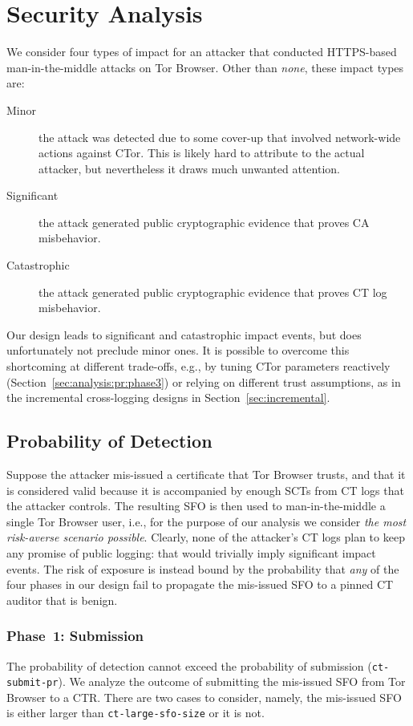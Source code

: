 \section{Security Analysis} \label{sec:analysis}
We consider four types of impact for an attacker that conducted
HTTPS-based man-in-the-middle attacks on Tor Browser.  Other than \emph{none},
these impact types are:
\begin{description}
	\item[Minor] the attack was detected due to some cover-up that involved
		network-wide actions against CTor.  This is likely hard to attribute to
		the actual attacker, but nevertheless it draws much unwanted attention.
	\item[Significant] the attack generated public cryptographic evidence
		that proves CA misbehavior.
	\item[Catastrophic] the attack generated public cryptographic evidence
		that proves CT log misbehavior.
\end{description}

Our design leads to significant and catastrophic impact events, but does
unfortunately not preclude minor ones.  It is possible to overcome this
shortcoming at different trade-offs, e.g., by tuning CTor parameters reactively
(Section~\ref{sec:analysis:pr:phase3}) or relying on different trust
assumptions, as in the incremental cross-logging designs in
Section~\ref{sec:incremental}.

\subsection{Probability of Detection} \label{sec:analysis:pr}
Suppose the attacker mis-issued a certificate that Tor Browser trusts, and that
it is considered valid because it is accompanied by enough SCTs from CT logs
that the attacker controls.  The resulting SFO is then used to man-in-the-middle
a single Tor Browser user, i.e., for the purpose of our analysis we consider
\emph{the most risk-averse scenario possible}.  Clearly, none of the attacker's
CT logs plan to keep any promise of public logging:
	that would trivially imply significant impact events.
The risk of exposure is instead bound by the probability that \emph{any} of the
four phases in our design fail to propagate the mis-issued SFO to a pinned CT
auditor that is benign.

\subsubsection{Phase~1: Submission} \label{sec:analysis:pr:phase1} 
The probability of detection cannot exceed the probability of submission
(\texttt{ct-submit-pr}). We analyze the outcome of submitting the mis-issued
SFO from Tor Browser to a CTR\@.  There are two cases to consider, namely, the
mis-issued SFO is either larger than \texttt{ct-large-sfo-size} or it is not.

